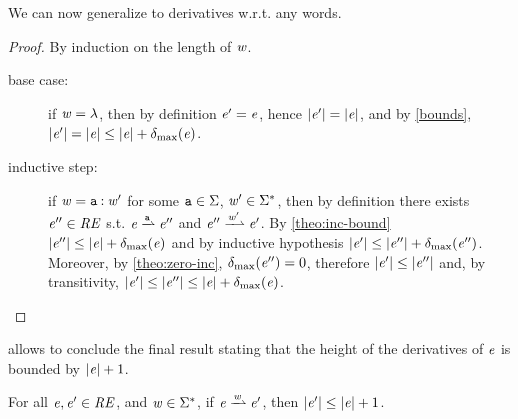 We can now generalize  to derivatives w.r.t. any words.
\begin{proof}
 By induction on the length of $\mathit {w}$.
 \begin{description}
  \item[base case:] if $\mathit {w}=\lambda$, then by definition $\mathit {e}'=\mathit {e}$, hence
   ${\mid}{\mathit {e}'}{\mid}={\mid}{\mathit {e}}{\mid}$, and by \cref{bounds}, ${\mid}{\mathit {e}'}{\mid}={\mid}{\mathit {e}}{\mid}\leq{\mid}{\ensuremath{\mathit {e}}}{\mid}+{\delta_{\max}}({\mathit {e}})$.

  \item[inductive step:]
   if $\mathit {w}=\mathtt {a}\mathbin{:}\mathit {w}'$ for some $\mathtt {a}\in\Sigma$, $\mathit {w}'\in\Sigma^*$, then by definition there exists $\mathit {e}''\in\mathit {RE}$ s.t. $\re\parDer{\sym}\re''$ and $\re''\parDer{\word'}\re'$. By \cref{theo:inc-bound} ${\mid}{\mathit {e}''}{\mid}\leq{\mid}{\ensuremath{\mathit {e}}}{\mid}+{\delta_{\max}}({\mathit {e}})$ and by inductive hypothesis ${\mid}{\mathit {e}'}{\mid}\leq{\mid}{\ensuremath{\mathit {e}}''}{\mid}+{\delta_{\max}}({\mathit {e}''})$. Moreover, by \cref{theo:zero-inc},
   ${\delta_{\max}}({\mathit {e}''})=0$, therefore ${\mid}{\mathit {e}'}{\mid}\leq{\mid}{\ensuremath{\mathit {e}}''}{\mid}$ and, by transitivity,
   ${\mid}{\mathit {e}'}{\mid}\leq{\mid}{\ensuremath{\mathit {e}}''}{\mid}\leq{\mid}{\ensuremath{\mathit {e}}}{\mid}+{\delta_{\max}}({\mathit {e}})$.
 \end{description}
\end{proof}

 allows to conclude the final result stating that the height of the derivatives of $\mathit {e}$ is bounded by ${\mid}{\mathit {e}}{\mid}+1$.
\begin{corollary}
 For all $\mathit {e},\mathit {e}'\in\mathit {RE}$, and $\mathit {w}\in\Sigma^*$, if $\re\parDer{\word}\re'$, then ${\mid}{\mathit {e}'}{\mid}\leq{\mid}{\ensuremath{\mathit {e}}}{\mid}+1$.
\end{corollary}